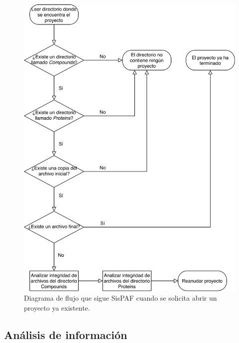 \begin{figure}[H]
    \centering
    \includegraphics[scale=0.3]{Capitulo4/imagenes/diagramaAbrirProy-1.png}
    \caption{Diagrama de flujo que sigue SisPAF cuando se solicita abrir un proyecto ya existente.}
    \label{abrir}
\end{figure}
\subsection{Análisis de información}
